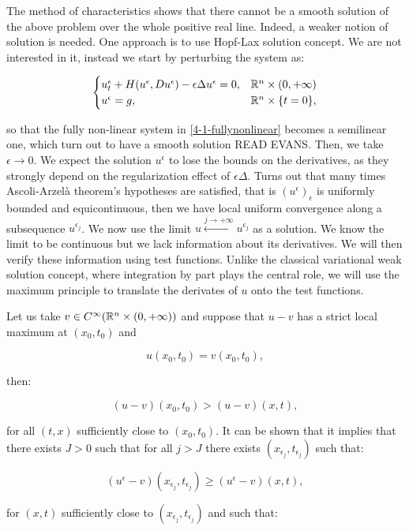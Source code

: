 The method of characteristics shows that there cannot be a smooth solution of the above problem over the whole positive 
real line. Indeed, a weaker notion of solution is needed. One approach is to use Hopf-Lax solution concept. We are not 
interested in it, instead we start by perturbing the system as:

\begin{equation}
    \begin{cases}
        u^{\epsilon}_t + H(u^{\epsilon},Du^{\epsilon}) -\epsilon\Delta u^{\epsilon}= 0,& \mathbb{R}^n\times(0,+\infty) \\
        u^{\epsilon} = g,& \mathbb{R}^n\times\{t=0\},
    \end{cases}
\end{equation}

so that the fully non-linear system in \ref{4-1-fullynonlinear} becomes a semilinear one, which turn out to have a smooth solution {\color{red}{}READ EVANS}. 
Then, we take $\epsilon\to0$. We expect the solution $u^{\epsilon}$ to lose the bounds on the derivatives, as they strongly depend on the 
regularization effect of $\epsilon\Delta$. Turns out that many times Ascoli-Arzelà theorem's hypotheses are satisfied, that is $(u^{\epsilon})_{\epsilon}$ 
is uniformly bounded and equicontinuous, then we have local uniform convergence along a subsequence $u^{\epsilon_j}$. We now use the limit
$u\xleftarrow{j\to+\infty}u^{\epsilon_j}$ as a solution. 
We know the limit to be continuous but we lack information about its derivatives. We will then verify these information using test functions. 
Unlike the classical variational weak solution concept, where integration by part plays the central role, we will use the maximum principle 
to translate the derivates of $u$ onto the test functions. 

Let us take $v\in C^{\infty}(\mathbb{R}^n\times(0,+\infty))$ and suppose that $u-v$ has a strict local maximum at $(x_0,t_0)$ and 

\[u(x_0,t_0) = v(x_0,t_0),\]

then:

\[(u-v)(x_0,t_0) > (u-v)(x,t),\]

for all $(t,x)$ sufficiently close to $(x_0,t_0)$. It can be shown that it implies that there exists $J>0$ such that for all 
$j>J$ there exists $(x_{\epsilon_j},t_{\epsilon_j})$ such that:

\[(u^{\epsilon}-v)(x_{\epsilon_j},t_{\epsilon_j}) \geq (u^{\epsilon}-v)(x,t),\]

for $(x,t)$ sufficiently close to $(x_{\epsilon_j},t_{\epsilon_j})$ and such that:

